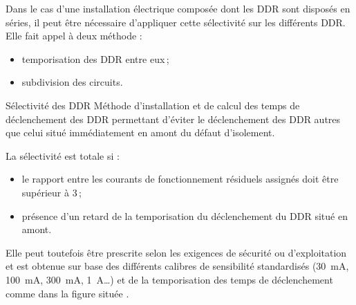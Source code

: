 Dans le cas d'une installation électrique composée dont les DDR sont disposés en séries, il peut être nécessaire d'appliquer cette sélectivité sur les différents DDR. Elle fait appel à deux méthode : 
\begin{itemize}
\item temporisation des DDR entre eux\,;
\item subdivision des circuits.
\end{itemize}

\begin{definition}{Sélectivité des DDR}{}
Méthode d'installation et de calcul des temps de déclenchement des DDR permettant d'éviter le déclenchement des DDR autres que celui situé immédiatement en amont du défaut d'isolement.
\end{definition}

La sélectivité est totale si :
\begin{itemize}
\item le rapport entre les courants de fonctionnement résiduels assignés doit être supérieur à 3\,;
\item présence d'un retard de la temporisation du déclenchement du DDR situé en amont.
\end{itemize}
Elle peut toutefois être prescrite selon les exigences de sécurité ou d'exploitation et est obtenue sur base des différents calibres de sensibilité standardisés (\SI{30}{\milli\ampere}, \SI{100}{\milli\ampere}, \SI{300}{\milli\ampere}, \SI{1}{\ampere}\ldots) et de la temporisation des temps de déclenchement comme dans la figure située .



